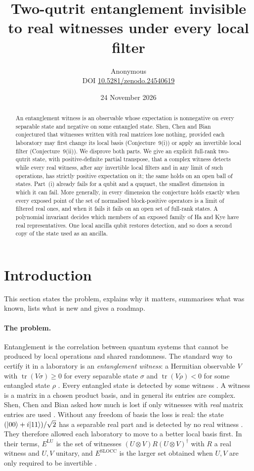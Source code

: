 \documentclass[11pt,a4paper]{article}
\title{\bfseries Two-qutrit entanglement invisible to real witnesses under every local filter}
\author{Anonymous\\[3pt]{\small DOI \href{https://doi.org/10.5281/zenodo.24540619}{10.5281/zenodo.24540619}}}\date{24 November 2026}
\theoremstyle{definition}\newtheorem{definition}[theorem]{Definition}\newtheorem*{conj}{Conjecture 9 of Shen, Chen and Bian}\newtheorem{remark}[theorem]{Remark}
\newcommand{\tr}{\operatorname{tr}}\newcommand{\im}{\operatorname{Im}}\newcommand{\adj}{\operatorname{adj}}\newcommand{\id}{\mathbb I}
\begin{document}
\maketitle
\begin{abstract}
An entanglement witness is an observable whose expectation is nonnegative on every separable state and negative on some entangled state. Shen, Chen and Bian conjectured that witnesses written with real matrices lose nothing, provided each laboratory may first change its local basis (Conjecture~9(i)) or apply an invertible local filter (Conjecture~9(ii)). We disprove both parts. We give an explicit full-rank two-qutrit state, with positive-definite partial transpose, that a complex witness detects while every real witness, after any invertible local filters and in any limit of such operations, has strictly positive expectation on it; the same holds on an open ball of states. Part~(i) already fails for a qubit and a ququart, the smallest dimension in which it can fail. More generally, in every dimension the conjecture holds exactly when every exposed point of the set of normalised block-positive operators is a limit of filtered real ones, and when it fails it fails on an open set of full-rank states. A polynomial invariant decides which members of an exposed family of Ha and Kye have real representatives. One local ancilla qubit restores detection, and so does a second copy of the state used as an ancilla.
\end{abstract}

\section{Introduction}
This section states the problem, explains why it matters, summarises what was known, lists what is new and gives a roadmap.

\paragraph{The problem.}
Entanglement is the correlation between quantum systems that cannot be produced by local operations and shared randomness. The standard way to certify it in a laboratory is an \emph{entanglement witness}: a Hermitian observable $V$ with $\tr(V\sigma)\geq0$ for every separable state $\sigma$ and $\tr(V\rho)<0$ for some entangled state $\rho$ \cite{horodecki,guhne}. Every entangled state is detected by some witness \cite{horodecki}. A witness is a matrix in a chosen product basis, and in general its entries are complex. Shen, Chen and Bian asked how much is lost if only witnesses with \emph{real} matrix entries are used \cite{shen}. Without any freedom of basis the loss is real: the state $(\lvert 00\rangle+i\lvert 11\rangle)/\sqrt2$ has a separable real part and is detected by no real witness \cite[Section III]{shen}. They therefore allowed each laboratory to move to a better local basis first. In their terms, $E^{\mathrm{LU}}$ is the set of witnesses $(U\otimes V)R(U\otimes V)^\dagger$ with $R$ a real witness and $U,V$ unitary, and $E^{\mathrm{SLOCC}}$ is the larger set obtained when $U,V$ are only required to be invertible \cite[Definition~1]{shen}.
\end{document}
